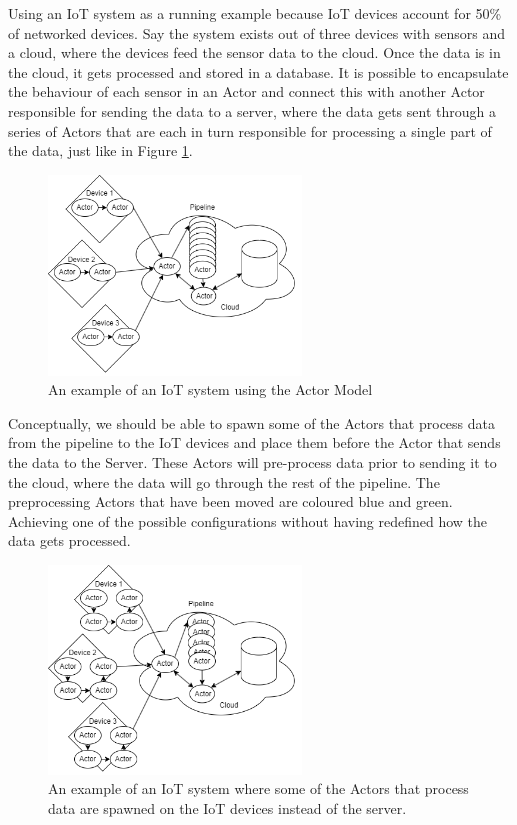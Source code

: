 \documentclass[a4paper]{article}
\begin{document}
Using an IoT system as a running example because IoT devices account for 50\% of networked devices\cite{differentnetworkneedsiot}. Say the system exists out of three devices with sensors and a cloud, where the devices feed the sensor data to the cloud. Once the data is in the cloud, it gets processed and stored in a database. It is possible to encapsulate the behaviour of each sensor in an Actor and connect this with another Actor responsible for sending the data to a server, where the data gets sent through a series of Actors that are each in turn responsible for processing a single part of the data, just like in Figure \ref{fig:iotActorExample1}.
\begin{figure}[H]
    \centering
    \includegraphics[width=0.6\textwidth]{iotActorExample1.png}
    \caption{An example of an IoT system using the Actor Model}
    \label{fig:iotActorExample1}
\end{figure}
Conceptually, we should be able to spawn some of the Actors that process data from the pipeline to the IoT devices and place them before the Actor that sends the data to the Server. These Actors will pre-process data prior to sending it to the cloud, where the data will go through the rest of the pipeline. The preprocessing Actors that have been moved are coloured blue and green. Achieving one of the possible configurations without having redefined how the data gets processed.
\begin{figure}[H]
    \centering
    \includegraphics[width=0.6\textwidth]{iotActorsMoved.png}
    \caption{An example of an IoT system where some of the Actors that process data are spawned on the IoT devices instead of the server.}
    \label{fig:iotActorExample2}
\end{figure}
\end{document}
